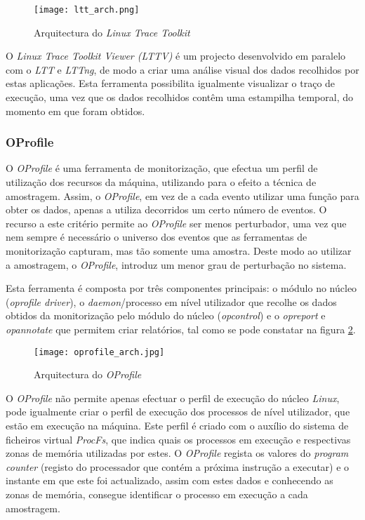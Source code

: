 \begin{figure}[!htb]
       \centering
       \texttt{[image: ltt\_arch.png]}
       \caption{Arquitectura do \textit{Linux Trace Toolkit} \cite{Yaghmour:2000:MCS:1267724.1267726}}
	\label{fig:ltt_arch}
\end{figure}

O \textit{Linux Trace Toolkit Viewer (LTTV)} é um projecto desenvolvido em paralelo com o \textit{LTT} e \textit{LTTng}, de modo a criar uma análise visual dos dados recolhidos por estas aplicações.
Esta ferramenta possibilita igualmente visualizar o traço de execução, uma vez que os dados recolhidos contêm uma estampilha temporal, do momento em que foram obtidos.

\subsubsection{OProfile}\label{cap:Oprofile_overview}
O \textit{OProfile} é uma ferramenta de monitorização, que efectua um perfil de utilização dos recursos da máquina, utilizando para o efeito a técnica de amostragem.
Assim, o \textit{OProfile}, em vez de a cada evento utilizar uma função para obter os dados, apenas a utiliza decorridos um certo número de eventos.
O recurso a este critério permite ao \textit{OProfile} ser menos perturbador, uma vez que nem sempre é necessário o universo dos eventos que as ferramentas de monitorização capturam, mas tão somente uma amostra.
Deste modo ao utilizar a amostragem, o \textit{OProfile}, introduz um menor grau de perturbação no sistema\cite{Will:TuninProgrOProf}.

Esta ferramenta é composta por três componentes principais: o módulo no núcleo (\textit{oprofile driver}), o \textit{daemon}/processo em nível utilizador que recolhe os dados obtidos da monitorização pelo módulo do núcleo (\textit{opcontrol}) e o \textit{opreport} e \textit{opannotate} que permitem criar relatórios, tal como se pode constatar na figura \ref{fig:oprofile_arch}.

\begin{figure}[!htb]
       \centering
       \texttt{[image: oprofile\_arch.jpg]}
       \caption{Arquitectura do \textit{OProfile} \cite{Will:TuninProgrOProf}}
	\label{fig:oprofile_arch}
\end{figure}

O \textit{OProfile} não permite apenas efectuar o perfil de execução do núcleo \textit{Linux}, pode igualmente criar o perfil de execução dos processos de nível utilizador, que estão em execução na máquina.
Este perfil é criado com o auxílio do sistema de ficheiros virtual \textit{ProcFs}, que indica quais os processos em execução e respectivas zonas de memória utilizadas por estes.
O \textit{OProfile} regista os valores do \textit{program counter} (registo do processador que contém a próxima instrução a executar) e o instante em que este foi actualizado, assim com estes dados e conhecendo as zonas de memória, consegue identificar o processo em execução a cada amostragem.

